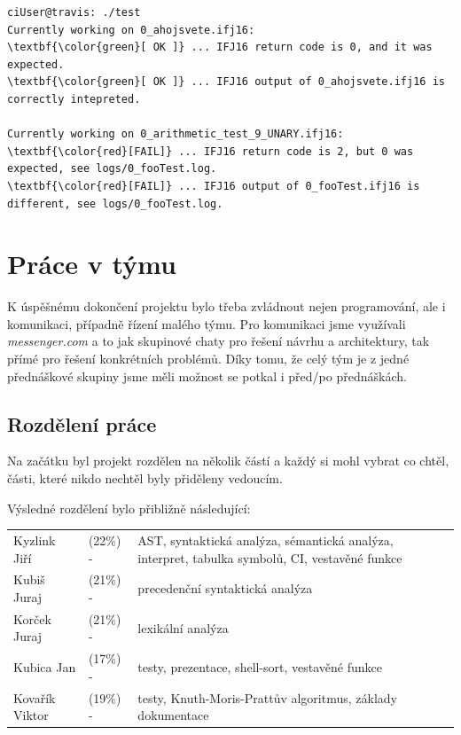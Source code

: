 \documentclass[a4paper,11pt]{article}
\begin{document}

\begin{Verbatim}
ciUser@travis: ./test
Currently working on 0_ahojsvete.ifj16:
\textbf{\color{green}[ OK ]} ... IFJ16 return code is 0, and it was expected.
\textbf{\color{green}[ OK ]} ... IFJ16 output of 0_ahojsvete.ifj16 is correctly intepreted.

Currently working on 0_arithmetic_test_9_UNARY.ifj16:
\textbf{\color{red}[FAIL]} ... IFJ16 return code is 2, but 0 was expected, see logs/0_fooTest.log.
\textbf{\color{red}[FAIL]} ... IFJ16 output of 0_fooTest.ifj16 is different, see logs/0_fooTest.log.
\end{Verbatim}

\section{Práce v týmu}
K úspěšnému dokončení projektu bylo třeba zvládnout nejen programování, ale i komunikaci, případně řízení malého týmu. Pro komunikaci jsme využívali \emph{messenger.com} a to jak skupinové chaty pro řešení návrhu a architektury, tak přímé pro řešení konkrétních problémů. Díky tomu, že celý tým je z jedné přednáškové skupiny jsme měli možnost se potkal i před/po přednáškách.

\subsection{Rozdělení práce}
Na začátku byl projekt rozdělen na několik částí a každý si mohl vybrat co chtěl, části, které nikdo nechtěl byly přiděleny vedoucím.

Výsledné rozdělení bylo přibližně následující:\medskip

\begin{tabular}{llp{11.9cm}}
	Kyzlink Jiří &(22\%) \space - & AST, syntaktická analýza, sémantická analýza, interpret, tabulka symbolů, CI, vestavěné funkce \\
	Kubiš Juraj	&(21\%) \space - & precedenční syntaktická analýza \\
	Korček Juraj &(21\%) \space - & lexikální analýza \\
	Kubica Jan &(17\%) \space - & testy, prezentace, shell-sort, vestavěné funkce \\
	Kovařík Viktor &(19\%) \space - & testy, Knuth-Moris-Prattův algoritmus, základy dokumentace \\
\end{tabular}
\medskip
\end{document}
